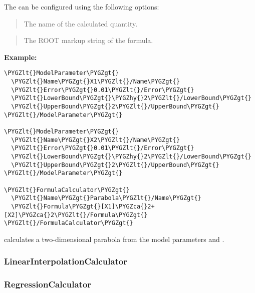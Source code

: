 \documentclass[letterpaper,10pt,english]{sphinxmanual}
\def\PYGZca{\char`\^}
\def\PYGZlt{\char`\<}
\def\PYGZgt{\char`\>}
\def\PYGZhy{\char`\-}
\begin{document}
The  can be configured using the following options:

\begin{quote}

The name of the calculated quantity.
\end{quote}

\begin{quote}

The ROOT markup string of the formula.
\end{quote}

\textbf{Example:}

\begin{Verbatim}[commandchars=\\\{\}]
\PYGZlt{}ModelParameter\PYGZgt{}
  \PYGZlt{}Name\PYGZgt{}X1\PYGZlt{}/Name\PYGZgt{}
  \PYGZlt{}Error\PYGZgt{}0.01\PYGZlt{}/Error\PYGZgt{}
  \PYGZlt{}LowerBound\PYGZgt{}\PYGZhy{}2\PYGZlt{}/LowerBound\PYGZgt{}
  \PYGZlt{}UpperBound\PYGZgt{}2\PYGZlt{}/UpperBound\PYGZgt{}
\PYGZlt{}/ModelParameter\PYGZgt{}

\PYGZlt{}ModelParameter\PYGZgt{}
  \PYGZlt{}Name\PYGZgt{}X2\PYGZlt{}/Name\PYGZgt{}
  \PYGZlt{}Error\PYGZgt{}0.01\PYGZlt{}/Error\PYGZgt{}
  \PYGZlt{}LowerBound\PYGZgt{}\PYGZhy{}2\PYGZlt{}/LowerBound\PYGZgt{}
  \PYGZlt{}UpperBound\PYGZgt{}2\PYGZlt{}/UpperBound\PYGZgt{}
\PYGZlt{}/ModelParameter\PYGZgt{}

\PYGZlt{}FormulaCalculator\PYGZgt{}
  \PYGZlt{}Name\PYGZgt{}Parabola\PYGZlt{}/Name\PYGZgt{}
  \PYGZlt{}Formula\PYGZgt{}[X1]\PYGZca{}2+[X2]\PYGZca{}2\PYGZlt{}/Formula\PYGZgt{}
\PYGZlt{}/FormulaCalculator\PYGZgt{}
\end{Verbatim}

calculates a two-dimensional parabola from the model parameters  and .


\subsubsection{LinearInterpolationCalculator}
\label{linearinterpolation_calculator::doc}\label{linearinterpolation_calculator:linearinterpolationcalculator}




\subsubsection{RegressionCalculator}
\label{regression_calculator:regressioncalculator}\label{regression_calculator::doc}
\begin{quote}


\end{quote}
\end{document}

